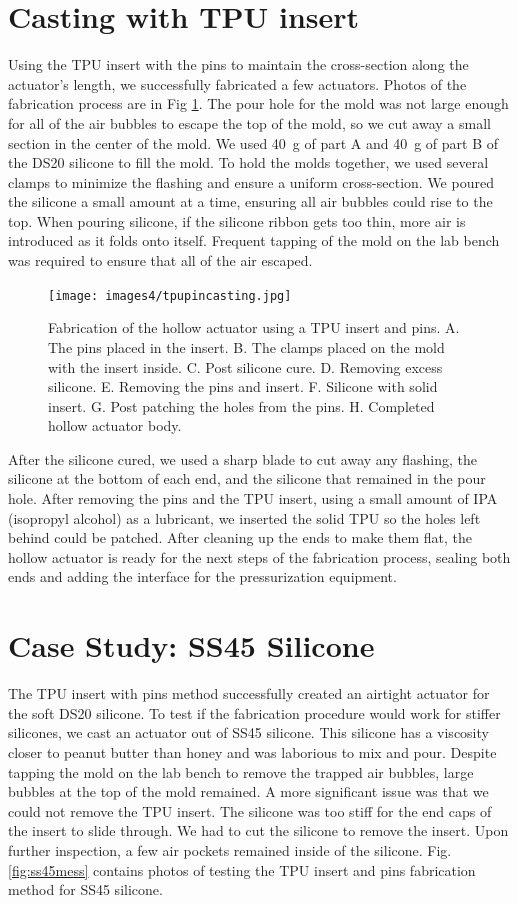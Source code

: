 \section{Casting with TPU insert}
Using the TPU insert with the pins to maintain the cross-section along the actuator's length, we successfully fabricated a few actuators. Photos of the fabrication process are in Fig \ref{fig:tpupinfab}. The pour hole for the mold was not large enough for all of the air bubbles to escape the top of the mold, so we cut away a small section in the center of the mold. We used 40~g of part A and 40~g of part B of the DS20 silicone to fill the mold. To hold the molds together, we used several clamps to minimize the flashing and ensure a uniform cross-section. We poured the silicone a small amount at a time, ensuring all air bubbles could rise to the top. When pouring silicone, if the silicone ribbon gets too thin, more air is introduced as it folds onto itself. Frequent tapping of the mold on the lab bench was required to ensure that all of the air escaped. 

\begin{figure}[h]
    \centering
    \texttt{[image: images4/tpupincasting.jpg]}
    \caption{Fabrication of the hollow actuator using a TPU insert and pins. A. The pins placed in the insert. B. The clamps placed on the mold with the insert inside. C. Post silicone cure. D. Removing excess silicone. E. Removing the pins and insert. F. Silicone with solid insert. G. Post patching the holes from the pins. H. Completed hollow actuator body.}
    \label{fig:tpupinfab}
\end{figure}

After the silicone cured, we used a sharp blade to cut away any flashing, the silicone at the bottom of each end, and the silicone that remained in the pour hole. After removing the pins and the TPU insert, using a small amount of IPA (isopropyl alcohol) as a lubricant, we inserted the solid TPU so the holes left behind could be patched. After cleaning up the ends to make them flat, the hollow actuator is ready for the next steps of the fabrication process, sealing both ends and adding the interface for the pressurization equipment. 

\clearpage
\section{Case Study: SS45 Silicone}
The TPU insert with pins method successfully created an airtight actuator for the soft DS20 silicone. To test if the fabrication procedure would work for stiffer silicones, we cast an actuator out of SS45 silicone. This silicone has a viscosity closer to peanut butter than honey and was laborious to mix and pour. Despite tapping the mold on the lab bench to remove the trapped air bubbles, large bubbles at the top of the mold remained. A more significant issue was that we could not remove the TPU insert. The silicone was too stiff for the end caps of the insert to slide through. We had to cut the silicone to remove the insert. Upon further inspection, a few air pockets remained inside of the silicone. Fig. \ref{fig:ss45mess} contains photos of testing the TPU insert and pins fabrication method for SS45 silicone. 

